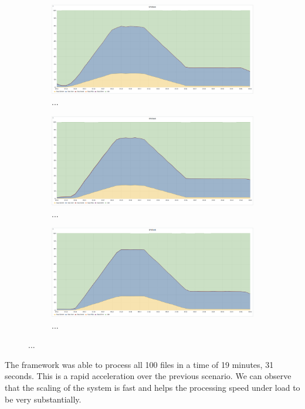 \begin{figure}[H]
    \begin{subfigure}[h]{0.5\linewidth}
        \centering
        \includegraphics[width=1\linewidth]{other-fig/tests/overload_cpu1.png}
        \caption{...}
    \end{subfigure}
    \hfill
    \begin{subfigure}[h]{0.5\linewidth}
        \centering
        \includegraphics[width=1\linewidth]{other-fig/tests/overload_cpu2.png}
        \caption{...}
    \end{subfigure}
    \begin{subfigure}[h]{1\linewidth}
        \centering
        \includegraphics[width=0.5\linewidth]{other-fig/tests/overload_cpu3.png}
        \caption{...}
    \end{subfigure}
    \caption{...}
\end{figure}

The framework was able to process all 100 files in a time of 19 minutes, 31 seconds. This is a rapid acceleration over the previous scenario. We can observe that the scaling of the system is fast and helps the processing speed under load to be very substantially.

